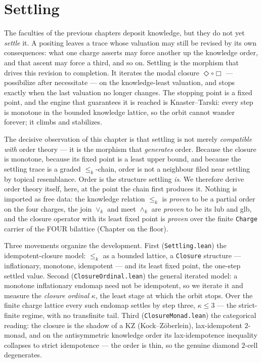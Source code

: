 \chapter{Settling}\label{ch:settling}

The faculties of the previous chapters deposit knowledge, but they do not yet
\emph{settle} it. A positing leaves a trace whose valuation may still be revised
by its own consequences: what one charge asserts may force another up the
knowledge order, and that ascent may force a third, and so on. Settling is the
morphism that drives this revision to completion. It iterates the modal closure
$\Diamond\circ\Box$ --- possibilize after necessitate --- on the
knowledge-least valuation, and stops exactly when the last valuation no longer
changes. The stopping point is a fixed point, and the engine that guarantees it
is reached is Knaster--Tarski: every step is monotone in the bounded knowledge
lattice, so the orbit cannot wander forever; it climbs and stabilizes.

The decisive observation of this chapter is that settling is not merely
\emph{compatible with} order theory --- it is the morphism that \emph{generates}
order. Because the closure is monotone, because its fixed point is a least upper
bound, and because the settling trace is a graded $\le_k$-chain, order is not a
neighbour filed near settling by topical resemblance. Order is the structure
settling \emph{is}. We therefore derive order theory itself, here, at the point
the chain first produces it. Nothing is imported as free data: the knowledge
relation $\le_k$ is \emph{proven} to be a partial order on the four charges, the
join $\vee_k$ and meet $\wedge_k$ are \emph{proven} to be its lub and glb, and
the closure operator with its least fixed point is \emph{proven} over the finite
\texttt{Charge} carrier of the FOUR bilattice (Chapter on the floor).

Three movements organize the development. First (\texttt{Settling.lean}) the
idempotent-closure model: $\le_k$ as a bounded lattice, a \texttt{Closure}
structure --- inflationary, monotone, idempotent --- and its least fixed point,
the one-step settled value. Second (\texttt{ClosureOrdinal.lean}) the general
iterated model: a monotone inflationary endomap need not be idempotent, so we
iterate it and measure the \emph{closure ordinal} $\kappa$, the least stage at
which the orbit stops. Over the finite charge lattice every such endomap settles
by step three, $\kappa \le 3$ --- the strict-finite regime, with no transfinite
tail. Third (\texttt{ClosureMonad.lean}) the categorical reading: the closure is
the shadow of a KZ (Kock--Z\"oberlein), lax-idempotent $2$-monad, and on the
antisymmetric knowledge order its lax-idempotence inequality collapses to strict
idempotence --- the order is thin, so the genuine diamond $2$-cell degenerates.

